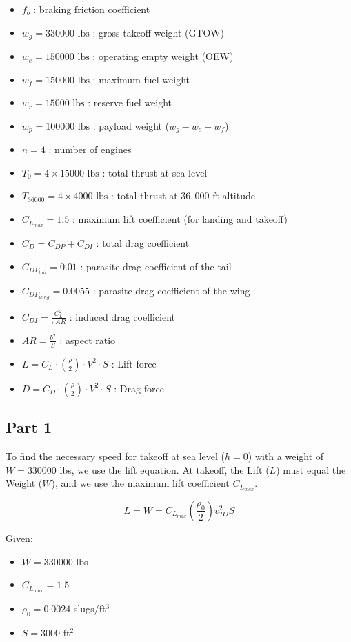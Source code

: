 \documentclass{KPS_assignment}
\begin{document}
\begin{itemize}
    \item $f_b$ : braking friction coefficient
    \item $w_g = 330000 \text{ lbs}$ : gross takeoff weight (GTOW)
    \item $w_e = 150000 \text{ lbs}$ : operating empty weight (OEW)
    \item $w_f = 150000 \text{ lbs}$ : maximum fuel weight
    \item $w_r = 15000 \text{ lbs}$ : reserve fuel weight
    \item $w_p = 100000 \text{ lbs}$ : payload weight ($w_g - w_e - w_f$)
    \item $n = 4$ : number of engines
    \item $T_0 = 4 \times 15000 \text{ lbs}$ : total thrust at sea level
    \item $T_{36000} = 4 \times 4000 \text{ lbs}$ : total thrust at $36,000 \text{ ft}$ altitude
    \item $C_{L_{max}} = 1.5$ : maximum lift coefficient (for landing and takeoff)
    \item $C_D = C_{DP} + C_{DI}$ : total drag coefficient
    \item $C_{DP_{tail}} = 0.01$ : parasite drag coefficient of the tail
    \item $C_{DP_{wing}} = 0.0055$ : parasite drag coefficient of the wing
    \item $C_{DI} = \frac{C_{L}^2}{\pi AR}$ : induced drag coefficient
    \item $AR = \frac{b^2}{S}$ : aspect ratio
    \item $L = C_L \cdot \left(\frac{\rho}{2}\right) \cdot V^2 \cdot S$ : Lift force
    \item $D = C_D \cdot \left(\frac{\rho}{2}\right) \cdot V^2 \cdot S$ : Drag force
\end{itemize}

\subsection*{Part 1}
To find the necessary speed for takeoff at sea level ($h=0$) with a weight of $W = 330000$ lbs, we use the lift equation. At takeoff, the Lift ($L$) must equal the Weight ($W$), and we use the maximum lift coefficient $C_{L_{max}}$.

$$ L = W = C_{L_{max}} \left( \frac{\rho_0}{2} \right) v_{TO}^2 S $$

Given:
\begin{itemize}
    \item $W = 330000$ lbs
    \item $C_{L_{max}} = 1.5$
    \item $\rho_0 = 0.0024$ slugs/ft$^3$
    \item $S = 3000$ ft$^2$
\end{itemize}
\end{document}
